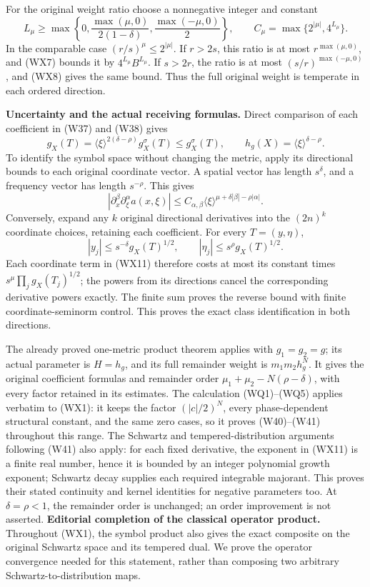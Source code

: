 \documentclass[
  11pt,
]{article}
\begin{document}
For the original weight ratio choose a nonnegative integer and constant
\[
 L_\mu\geq\max\left\{0,
             \frac{\max(\mu,0)}{2(1-\delta)},
             \frac{\max(-\mu,0)}2\right\},\qquad
 C_\mu=\max\{2^{|\mu|},4^{L_\mu}\}.
 \tag{WX9}
\] In the comparable case \((r/s)^\mu\leq2^{|\mu|}\). If \(r>2s\), this
ratio is at most \(r^{\max(\mu,0)}\), and (WX7) bounds it by
\(4^{L_\mu}B^{L_\mu}\). If \(s>2r\), the ratio is at most
\((s/r)^{\max(-\mu,0)}\), and (WX8) gives the same bound. Thus the full
original weight is temperate in each ordered direction.

\textbf{Uncertainty and the actual receiving formulas.} Direct
comparison of each coefficient in (W37) and (W38) gives \[
 g_X(T)=\langle\xi\rangle^{2(\delta-\rho)}g_X^\sigma(T)
 \leq g_X^\sigma(T),\qquad
 h_g(X)=\langle\xi\rangle^{\delta-\rho}.
 \tag{WX10}
\] To identify the symbol space without changing the metric, apply its
directional bounds to each original coordinate vector. A spatial vector
has length \(s^\delta\), and a frequency vector has length
\(s^{-\rho}\). This gives \[
 |\partial_x^\beta\partial_\xi^\alpha a(x,\xi)|
 \leq C_{\alpha,\beta}
       \langle\xi\rangle^{\mu+\delta|\beta|-\rho|\alpha|}.
 \tag{WX11}
\] Conversely, expand any \(k\) original directional derivatives into
the \((2n)^k\) coordinate choices, retaining each coefficient. For every
\(T=(y,\eta)\), \[
 |y_j|\leq s^{-\delta}g_X(T)^{1/2},\qquad
 |\eta_j|\leq s^\rho g_X(T)^{1/2}.
 \tag{WX12}
\] Each coordinate term in (WX11) therefore costs at most its constant
times \(s^\mu\prod_jg_X(T_j)^{1/2}\); the powers from its directions
cancel the corresponding derivative powers exactly. The finite sum
proves the reverse bound with finite coordinate-seminorm control. This
proves the exact class identification in both directions.

The already proved one-metric product theorem applies with
\(g_1=g_2=g\); its actual parameter is \(H=h_g\), and its full remainder
weight is \(m_1m_2h_g^N\). It gives the original coefficient formulas
and remainder order \(\mu_1+\mu_2-N(\rho-\delta)\), with every factor
retained in its estimates. The calculation (WQ1)--(WQ5) applies verbatim
to (WX1): it keeps the factor \((|c|/2)^N\), every phase-dependent
structural constant, and the same zero cases, so it proves (W40)--(W41)
throughout this range. The Schwartz and tempered-distribution arguments
following (W41) also apply: for each fixed derivative, the exponent in
(WX11) is a finite real number, hence it is bounded by an integer
polynomial growth exponent; Schwartz decay supplies each required
integrable majorant. This proves their stated continuity and kernel
identities for negative parameters too. At \(\delta=\rho<1\), the
remainder order is unchanged; an order improvement is not asserted.
\textbf{Editorial completion of the classical operator product.}
Throughout (WX1), the symbol product also gives the exact composite on
the original Schwartz space and its tempered dual. We prove the operator
convergence needed for this statement, rather than composing two
arbitrary Schwartz-to-distribution maps.
\end{document}
